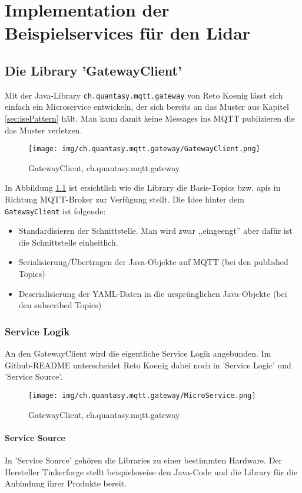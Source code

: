 \chapter{Implementation der Beispielservices für den Lidar}
\section{Die Library 'GatewayClient'}
Mit der  Java-Library \verb|ch.quantasy.mqtt.gateway| von Reto Koenig\cite{ch.quantasy.mqtt.gateway} lässt sich einfach ein Microservice entwickeln, der sich bereits an das Muster aus Kapitel \ref{sec:isePattern} hält. Man kann damit keine Messages ins MQTT publizieren die das Muster verletzen. 
\begin{figure}[H]
	\centering
	\texttt{[image: img/ch.quantasy.mqtt.gateway/GatewayClient.png]}
	\caption{GatewayClient, ch.quantasy.mqtt.gateway\cite{ch.quantasy.mqtt.gateway}}
	\label{fig:gatewayclient}
\end{figure}
In Abbildung \ref{fig:gatewayclient} ist ersichtlich wie die Library die Basis-Topics bzw. \acrshort{api}s in Richtung MQTT-Broker zur Verfügung stellt. Die Idee hinter dem \verb|GatewayClient| ist folgende:
\begin{itemize}
	\item
	Standardisieren der Schnittstelle. Man wird zwar ,,eingeengt'' aber dafür ist die Schnittstelle einheitlich.
	\item
	Serialisierung/Übertragen der Java-Objekte auf MQTT (bei den published Topics)
	\item
	Deserialisierung der YAML-Daten in die ursprünglichen Java-Objekte (bei den subscribed Topics)
\end{itemize}
\subsection{Service Logik}
An den GatewayClient wird die eigentliche Service Logik angebunden. Im Github-README unterscheidet Reto Koenig\cite{ch.quantasy.mqtt.gateway} dabei noch in 'Service Logic' und 'Service Source'. 
\begin{figure}[H]
	\centering
	\texttt{[image: img/ch.quantasy.mqtt.gateway/MicroService.png]}
	\caption{GatewayClient, ch.quantasy.mqtt.gateway\cite{ch.quantasy.mqtt.gateway}}
	\label{fig:microService}
\end{figure}
\subsubsection{Service Source}
In 'Service Source' gehören die Libraries zu einer bestimmten Hardware. Der Hersteller Tinkerforge\cite{tinkerforge-gmbh} stellt beispielsweise den Java-Code und die Library für die Anbindung ihrer Produkte bereit.
